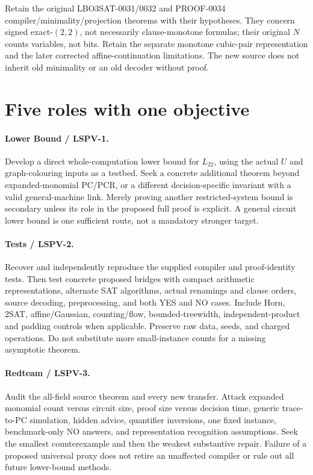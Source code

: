 \documentclass[11pt]{article}
\begin{document}
Retain the original LBO3SAT-0031/0032 and PROOF-0034 compiler/minimality/projection theorems with their hypotheses. They concern signed exact-$(2,2)$, not necessarily clause-monotone formulas; their original $N$ counts variables, not bits. Retain the separate monotone cubic-pair representation and the later corrected affine-continuation limitations. The new source does not inherit old minimality or an old decoder without proof.

\section{Five roles with one objective}
\paragraph{Lower Bound / LSPV-1.}
Develop a direct whole-computation lower bound for $L_{22}$, using the actual $U$ and graph-colouring inputs as a testbed. Seek a concrete additional theorem beyond expanded-monomial PC/PCR, or a different decision-specific invariant with a valid general-machine link. Merely proving another restricted-system bound is secondary unless its role in the proposed full proof is explicit. A general circuit lower bound is one sufficient route, not a mandatory stronger target.

\paragraph{Tests / LSPV-2.}
Recover and independently reproduce the supplied compiler and proof-identity tests. Then test concrete proposed bridges with compact arithmetic representations, alternate SAT algorithms, actual renamings and clause orders, source decoding, preprocessing, and both YES and NO cases. Include Horn, 2SAT, affine/Gaussian, counting/flow, bounded-treewidth, independent-product and padding controls when applicable. Preserve raw data, seeds, and charged operations. Do not substitute more small-instance counts for a missing asymptotic theorem.

\paragraph{Redteam / LSPV-3.}
Audit the all-field source theorem and every new transfer. Attack expanded monomial count versus circuit size, proof size versus decision time, generic trace-to-PC simulation, hidden advice, quantifier inversions, one fixed instance, benchmark-only NO answers, and representation recognition assumptions. Seek the smallest counterexample and then the weakest substantive repair. Failure of a proposed universal proxy does not retire an unaffected compiler or rule out all future lower-bound methods.
\end{document}
